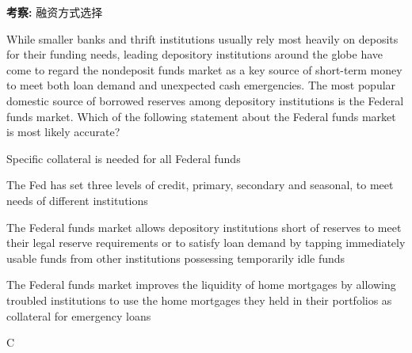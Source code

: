 \documentclass{article}
\newcounter{question} %
\newcommand{\checklist}[1]{
    \textbf{考察:} #1 \par %
    \addcontentsline{toc}{subsection}{题号\thequestion 考察: #1} %
    \vspace{2em} %
}
\begin{document}
\checklist{融资方式选择}


\begin{question}
    While smaller banks and thrift institutions usually rely most heavily on deposits for their funding needs, leading depository institutions around the globe have come to regard the nondeposit funds market as a key source of short-term money to meet both loan demand and unexpected cash emergencies. The most popular domestic source of borrowed reserves among depository institutions is the Federal funds market. Which of the following statement about the Federal funds market is most likely accurate?
\end{question}

\begin{choices}
    \item Specific collateral is needed for all Federal funds
    \item The Fed has set three levels of credit, primary, secondary and seasonal, to meet needs of different institutions
    \item The Federal funds market allows depository institutions short of reserves to meet their legal reserve requirements or to satisfy loan demand by tapping immediately usable funds from other institutions possessing temporarily idle funds
    \item The Federal funds market improves the liquidity of home mortgages by allowing troubled institutions to use the home mortgages they held in their portfolios as collateral for emergency loans
\end{choices}

\begin{correctanswer}
    C
\end{correctanswer}
\end{document}
